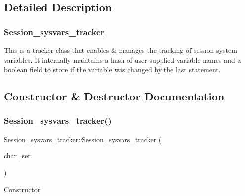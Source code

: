 \subsection{Detailed Description}
\subsubsection*{\mbox{\hyperlink{classSession__sysvars__tracker}{Session\+\_\+sysvars\+\_\+tracker}} }

This is a tracker class that enables \& manages the tracking of session system variables. It internally maintains a hash of user supplied variable names and a boolean field to store if the variable was changed by the last statement. 

\subsection{Constructor \& Destructor Documentation}
\mbox{\label{classSession__sysvars__tracker_a17daba98568ee2911733480813d9f541}} 
\subsubsection{\texorpdfstring{Session\+\_\+sysvars\+\_\+tracker()}{Session\_sysvars\_tracker()}}
{\footnotesize\ttfamily Session\+\_\+sysvars\+\_\+tracker\+::\+Session\+\_\+sysvars\+\_\+tracker (\begin{DoxyParamCaption}\item[{const C\+H\+A\+R\+S\+E\+T\+\_\+\+I\+N\+FO $\ast$}]{char\+\_\+set }\end{DoxyParamCaption})\hspace{0.3cm}{\ttfamily [inline]}}

Constructor \mbox{\label{classSession__sysvars__tracker_a0f236f107c187d9b04ade54c8d637d10}} 
